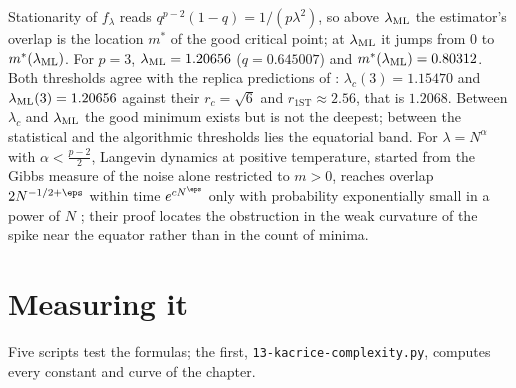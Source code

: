 \begin{refsection}
Stationarity of $f_\lambda$ reads $q^{p-2}(1-q)=1/(p\lambda^2)$, so above $\lambda_{\mathrm{ML}}$ the estimator's overlap is the location $m^*$ of the good critical point; at $\lambda_{\mathrm{ML}}$ it jumps from $0$ to $m^*(\lambda_{\mathrm{ML}})$. For $p=3$, $\lambda_{\mathrm{ML}}=1.20656$ ($q=0.645007$) and $m^*(\lambda_{\mathrm{ML}})=0.80312$. Both thresholds agree with the replica predictions of \textcite{RosEtAl2019}: $\lambda_c(3)=1.15470$ and $\lambda_{\mathrm{ML}}(3)=1.20656$ against their $r_c=\sqrt6$ and $r_{\mathrm{1ST}}\approx2.56$, that is $1.2068$. Between $\lambda_c$ and $\lambda_{\mathrm{ML}}$ the good minimum exists but is not the deepest; between the statistical and the algorithmic thresholds lies the equatorial band. For $\lambda=N^\alpha$ with $\alpha<\frac{p-2}2$, Langevin dynamics at positive temperature, started from the Gibbs measure of the noise alone restricted to $m>0$, reaches overlap $2N^{-1/2+\eps}$ within time $e^{cN^\eps}$ only with probability exponentially small in a power of $N$ \parencite[Theorem~2.10]{BenArousGheissariJagannath2020}; their proof locates the obstruction in the weak curvature of the spike near the equator rather than in the count of minima.

\section{Measuring it}\label{sec:kacrice:measuring}

Five scripts test the formulas; the first, \texttt{13-kacrice-complexity.py}, computes every constant and curve of the chapter.


\end{refsection}
